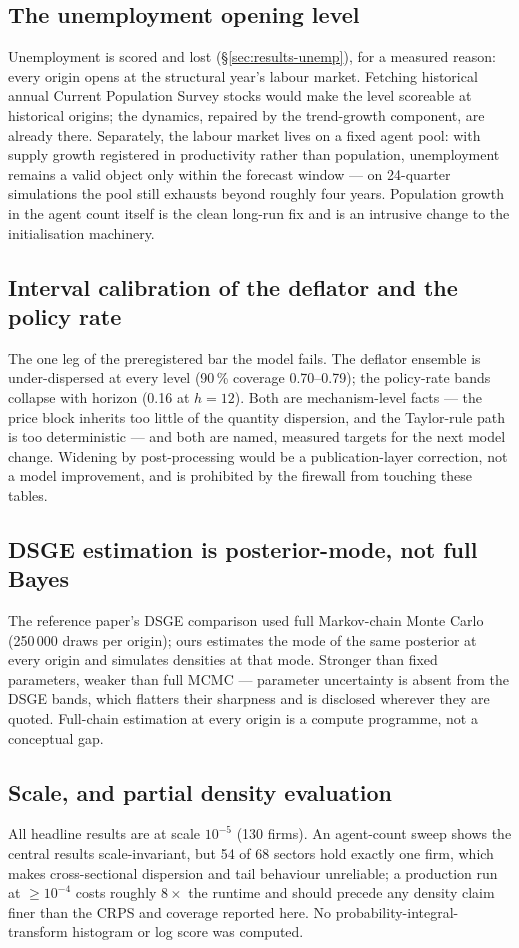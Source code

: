 \documentclass[11pt,a4paper]{article}
\begin{document}
\subsection{The unemployment opening level}
Unemployment is scored and lost (\S\ref{sec:results-unemp}), for a measured reason: every origin
opens at the structural year's labour market. Fetching historical annual Current Population
Survey stocks would make the level scoreable at historical origins; the dynamics, repaired by the
trend-growth component, are already there. Separately, the labour market lives on a fixed agent
pool: with supply growth registered in productivity rather than population, unemployment remains
a valid object only within the forecast window --- on 24-quarter simulations the pool still
exhausts beyond roughly four years. Population growth in the agent count itself is the clean
long-run fix and is an intrusive change to the initialisation machinery.

\subsection{Interval calibration of the deflator and the policy rate}
The one leg of the preregistered bar the model fails. The deflator ensemble is under-dispersed at
every level (90\,\% coverage 0.70--0.79); the policy-rate bands collapse with horizon (0.16 at
$h=12$). Both are mechanism-level facts --- the price block inherits too little of the quantity
dispersion, and the Taylor-rule path is too deterministic --- and both are named, measured
targets for the next model change. Widening by post-processing would be a publication-layer
correction, not a model improvement, and is prohibited by the firewall from touching these
tables.

\subsection{DSGE estimation is posterior-mode, not full Bayes}
The reference paper's DSGE comparison used full Markov-chain Monte Carlo (250\,000 draws per
origin); ours estimates the mode of the same posterior at every origin and simulates densities
at that mode. Stronger than fixed parameters, weaker than full MCMC --- parameter uncertainty is
absent from the DSGE bands, which flatters their sharpness and is disclosed wherever they are
quoted. Full-chain estimation at every origin is a compute programme, not a conceptual gap.

\subsection{Scale, and partial density evaluation}
All headline results are at scale $10^{-5}$ (130 firms). An agent-count sweep shows the central
results scale-invariant, but 54 of 68 sectors hold exactly one firm, which makes cross-sectional
dispersion and tail behaviour unreliable; a production run at $\ge10^{-4}$ costs roughly
$8\times$ the runtime and should precede any density claim finer than the CRPS and coverage
reported here. No probability-integral-transform histogram or log score was computed.
\end{document}
